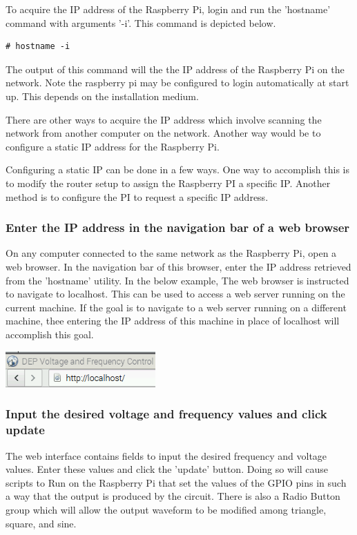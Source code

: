 \documentclass{article}	%
\begin{document}
\begin{multicols}{2}
To acquire the IP address of the Raspberry Pi,
login and run the 'hostname' command with arguments '-i'.
This command is depicted below.
\begin{lstlisting}
# hostname -i
\end{lstlisting}
The output of this command will the the IP address of
the Raspberry Pi on the network.
Note the raspberry pi may be configured to 
login automatically at start up.
This depends on the installation medium.

There are other ways to acquire the IP address
which involve scanning the network from
another computer on the network.
Another way would be to configure a static IP address
for the Raspberry Pi.

Configuring a static IP can be done in a few ways.
One way to accomplish this is
to modify the router setup to assign the Raspberry PI a specific IP.
Another method is to configure the PI to request a specific IP address.

\subsubsection{Enter the IP address in the navigation bar of a web browser}
On any computer connected to the same network as the Raspberry Pi,
open a web browser.
In the navigation bar of this browser,
enter the IP address retrieved from the 'hostname' utility.
In the below example,
The web browser is instructed to navigate to localhost.
This can be used to access a web server running on the current machine.
If the goal is to navigate to a web server running on a different
machine, thee
entering the IP address of this machine in place of localhost will
accomplish this goal.

\begin{center}
\includegraphics[width=0.43\textwidth,keepaspectratio]{localhost_navigation.png}
\end{center}

\subsubsection{Input the desired voltage and frequency values and click update}
The web interface contains fields to input the desired frequency and voltage values.
Enter these values and click the 'update' button.
Doing so will cause scripts to Run on the Raspberry Pi that
set the values of the GPIO pins in such a way that the output is produced
by the circuit.
There is also a Radio Button group which will allow the 
output waveform to be modified among triangle, square, and sine.


\end{multicols}
\end{document}
